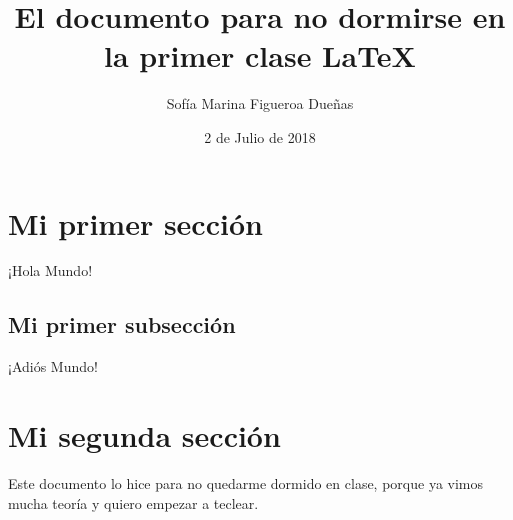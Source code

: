 \documentclass{article}
\title{El documento para no dormirse en la primer clase \LaTeX}
\author{Sof\'ia Marina Figueroa Due\~nas}
\date{2 de Julio de 2018}
\begin{document}
\maketitle

\section{Mi primer secci\'on}
¡Hola Mundo!

\subsection{Mi primer subsecci\'on}
¡Adi\'os Mundo!

\section{Mi segunda secci\'on}
Este documento lo hice para no quedarme dormido en clase, porque ya vimos mucha teor\'ia y quiero empezar a teclear.
\end{document}
